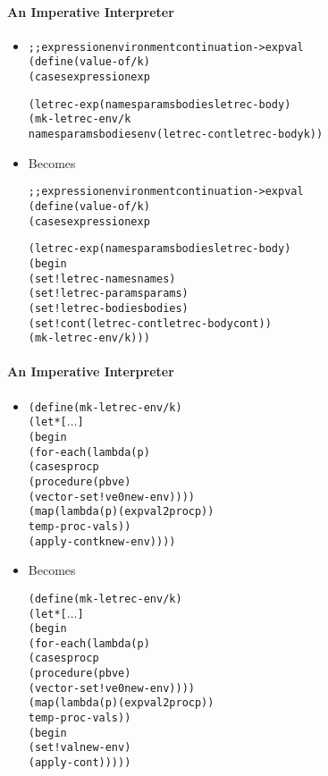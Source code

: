 \documentclass{beamer}
\newcommand{\dotss}{\(\ldots\)}
\begin{document}
\begin{frame}[fragile]
\framesubtitle{An Imperative Interpreter}
\begin{scriptsize}
\begin{itemize}
\item<1->
\begin{alltt}
;; expression environment continuation -> expval
(define (value-of/k)
  (cases expression exp

   (letrec-exp (names params bodies letrec-body)
    (mk-letrec-env/k 
      names params bodies env (letrec-cont letrec-body k))
\end{alltt}

\item<1-> Becomes
\begin{alltt}
;; expression environment continuation -> expval
(define (value-of/k)
  (cases expression exp

    (letrec-exp (names params bodies letrec-body)
                (begin
                  (set! letrec-names names)
                  (set! letrec-params params)
                  (set! letrec-bodies bodies)
                  (set! cont (letrec-cont letrec-body cont))
                  (mk-letrec-env/k)))
\end{alltt}

\end{itemize}
\end{scriptsize}
\end{frame}

\begin{frame}[fragile]
\framesubtitle{An Imperative Interpreter}
\begin{scriptsize}
\begin{itemize}
\item<1->
\begin{alltt}
(define (mk-letrec-env/k)
  (let* [\dotss]
    (begin
      (for-each (lambda (p)
                  (cases proc p
                    (procedure (p b ve)
                               (vector-set! ve 0 new-env))))
                (map (lambda (p) (expval2proc p))
                     temp-proc-vals))
      (apply-cont k new-env))))
\end{alltt}

\item<1-> Becomes
\begin{alltt}
(define (mk-letrec-env/k)
  (let* [\dotss]
    (begin
      (for-each (lambda (p)
                  (cases proc p
                    (procedure (p b ve)
                               (vector-set! ve 0 new-env))))
                (map (lambda (p) (expval2proc p))
                     temp-proc-vals))
      (begin
        (set! val new-env)
        (apply-cont)))))
\end{alltt}

\end{itemize}
\end{scriptsize}
\end{frame}
\end{document}
